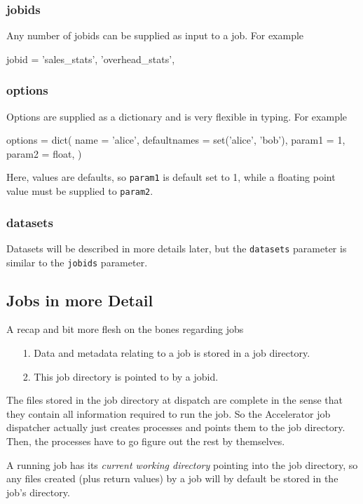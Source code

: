 \documentclass[a4paper]{article}
\begin{document}
\subsubsection{jobids}
Any number of jobids can be supplied as input to a job.  For example
\begin{python}
  jobid = {'sales_stats', 'overhead_stats',}
\end{python}

\subsubsection{options}
Options are supplied as a dictionary and is very flexible in typing.  For example
\begin{python}
  options = dict(
    name = 'alice',
    defaultnames = set('alice', 'bob'),
    param1 = 1,
    param2 = float,
  )
\end{python}
Here, values are defaults, so \texttt{param1} is default set to 1,
while a floating point value must be supplied to \texttt{param2}.

\subsubsection{datasets}
Datasets will be described in more details later, but the
\texttt{datasets} parameter is similar to the \texttt{jobids}
parameter.


\clearpage



\subsection{Jobs in more Detail}
A recap and bit more flesh on the bones regarding jobs
\begin{itemize}
\item[1.]  Data and metadata relating to a job is stored in a job directory.
\item[2.]  This job directory is pointed to by a jobid.
\end{itemize}
The files stored in the job directory at dispatch are complete in the
sense that they contain all information required to run the job.  So
the Accelerator job dispatcher actually just creates processes and
points them to the job directory.  Then, the processes have to go
figure out the rest by themselves.

A running job has its \textsl{current working directory} pointing into
the job directory, so any files created (plus return values) by a job
will by default be stored in the job's directory.
\end{document}
